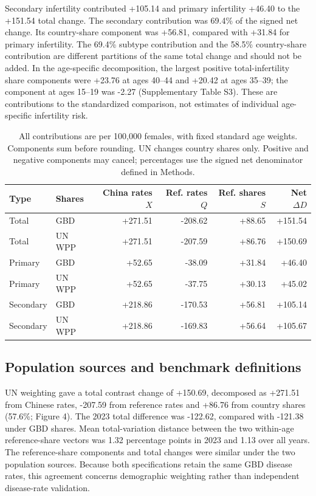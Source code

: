 \documentclass[11pt,a4paper]{article}
\begin{document}
Secondary infertility contributed +105.14 and primary infertility +46.40 to the +151.54 total change. The secondary contribution was 69.4\% of the signed net change. Its country-share component was +56.81, compared with +31.84 for primary infertility. The 69.4\% subtype contribution and the 58.5\% country-share contribution are different partitions of the same total change and should not be added. In the age-specific decomposition, the largest positive total-infertility share components were +23.76 at ages 40--44 and +20.42 at ages 35--39; the component at ages 15--19 was -2.27 (Supplementary Table S3). These are contributions to the standardized comparison, not estimates of individual age-specific infertility risk.

\begin{table}[htbp]\centering\small{}
\caption{Symmetric PCOS contrast-change decomposition, 1990--2023, by population source.}\label{tab:decomp}
\setlength{\tabcolsep}{4pt}
\begin{tabular}{llrrrr}\toprule
Type & Shares & China rates $X$ & Ref. rates $Q$ & Ref. shares $S$ & Net $\Delta D$\\\midrule
Total & GBD & +271.51 & -208.62 & +88.65 & +151.54\\
Total & UN WPP & +271.51 & -207.59 & +86.76 & +150.69\\
Primary & GBD & +52.65 & -38.09 & +31.84 & +46.40\\
Primary & UN WPP & +52.65 & -37.75 & +30.13 & +45.02\\
Secondary & GBD & +218.86 & -170.53 & +56.81 & +105.14\\
Secondary & UN WPP & +218.86 & -169.83 & +56.64 & +105.67\\
\bottomrule
\end{tabular}
\caption*{All contributions are per 100,000 females, with fixed standard age weights. Components sum before rounding. UN changes country shares only. Positive and negative components may cancel; percentages use the signed net denominator defined in Methods.}
\end{table}

\subsection{Population sources and benchmark definitions}
UN weighting gave a total contrast change of +150.69, decomposed as +271.51 from Chinese rates, -207.59 from reference rates and +86.76 from country shares (57.6\%; Figure 4). The 2023 total difference was -122.62, compared with -121.38 under GBD shares. Mean total-variation distance between the two within-age reference-share vectors was 1.32 percentage points in 2023 and 1.13 over all years. The reference-share components and total changes were similar under the two population sources. Because both specifications retain the same GBD disease rates, this agreement concerns demographic weighting rather than independent disease-rate validation.
\end{document}
